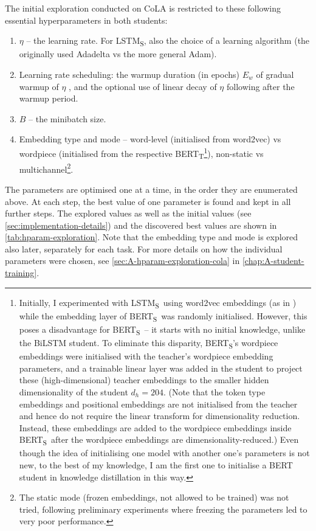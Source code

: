 \documentclass[bsc,frontabs,singlespacing,parskip,deptreport]{infthesis}
\def\BERTT{BERT\textsubscript{T}}
\def\BERTS{BERT\textsubscript{S}}
\def\LSTMS{LSTM\textsubscript{S}}
\begin{document}
{{    The initial exploration conducted on CoLA is restricted to these following essential hyperparameters in both students:
    \begin{enumerate}
      \item $\eta$ -- the learning rate. For \LSTMS, also the choice of a learning algorithm (the originally used Adadelta vs the more general Adam).
      \item Learning rate scheduling: the warmup duration (in epochs) $E_{w}$ of gradual warmup of $\eta$ \citep{Goyal_2017}, and the optional use of linear decay of $\eta$ following after the warmup period.
      \item $B$ -- the minibatch size.
      \item Embedding type and mode -- word-level (initialised from word2vec) vs wordpiece (initialised from the respective \BERTT\footnote{Initially, I experimented with \LSTMS~using word2vec embeddings (as in \citet{Tang_2019b,Tang_2019a}) while the embedding layer of \BERTS~was randomly initialised.
      However, this poses a disadvantage for \BERTS~-- it starts with no initial knowledge, unlike the BiLSTM student.
      To eliminate this disparity, \BERTS's wordpiece embeddings were initialised with the teacher's wordpiece embedding parameters, and a trainable linear layer was added in the student to project these (high-dimensional) teacher embeddings to the smaller hidden dimensionality of the student $d_h=204$.
      (Note that the token type embeddings and positional embeddings are not initialised from the teacher and hence do not require the linear transform for dimensionality reduction.
      Instead, these embeddings are added to the wordpiece embeddings inside \BERTS~after the wordpiece embeddings are dimensionality-reduced.)
      Even though the idea of initialising one model with another one's parameters is not new, to the best of my knowledge, I am the first one to initialise a BERT student in knowledge distillation in this way.}), non-static vs multichannel\footnote{The static mode (frozen embeddings, not allowed to be trained) was not tried, following preliminary experiments where freezing the parameters led to very poor performance.}.
    \end{enumerate}

    The parameters are optimised one at a time, in the order they are enumerated above. At each step, the best value of one parameter is found and kept in all further steps. The explored values as well as the initial values (see \autoref{sec:implementation-details}) and the discovered best values are shown in \autoref{tab:hparam-exploration}. Note that the embedding type and mode is explored also later, separately for each task.
    For more details on how the individual parameters were chosen, see \autoref{sec:A-hparam-exploration-cola} in \autoref{chap:A-student-training}.

}}
\end{document}
